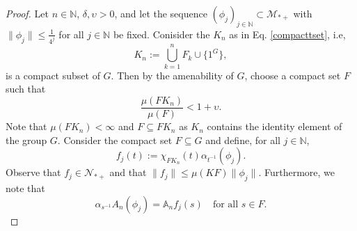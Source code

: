 \documentclass[11pt]{amsart}
\theoremstyle{definition}
\theoremstyle{myremark}
\numberwithin{equation}{section}
\def\A{\mathbb A}
\begin{document}
\begin{proof}
	Let $n \in \mathbb{N}$, $\delta, \upsilon > 0$, and let the sequence $(\phi_j)_{j \in \mathbb{N}} \subset \mathcal{M}_{*+}$ with $\|\phi_j\| \leq \frac{1}{4^j}$ for all $j \in \mathbb{N}$ be fixed. Conisider the $K_n$ as in Eq. \ref{compacttset}, i.e, 
	\[
	K_n := \bigcup_{k=1}^{n} F_k \cup \{ 1^G\},
	\]
	is a compact subset of $G$. Then by the amenability of $G$, choose a compact set $F$ such that 
	\[
	\frac{\mu(FK_n)}{\mu(F)} < 1+ \upsilon.
	\]
 Note that $\mu(FK_n) < \infty$ and $F \subseteq FK_n$ as $K_n$ contains the identity element of the group $G$. Consider the  compact set $F \subseteq G$ and define, for all $j \in \mathbb{N}$, 
	\[
	f_j(t) := \chi_{FK_n}(t) \alpha_{t^{-1}}(\phi_j).
	\]
	Observe that $f_j \in \mathcal{N}_{*+}$ and that $\|f_j\| \leq \mu(KF) \|\phi_j\|$. Furthermore, we note that 
	\[
	\alpha_{s^{-1}} A_n(\phi_j) = \A_n f_j(s) \quad \text{for all } s \in F.
	\]


\end{proof}
\end{document}
